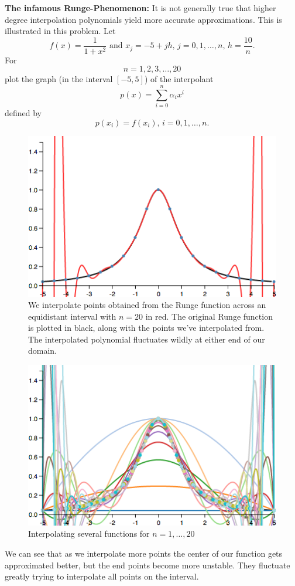\textbf{The infamous Runge-Phenomenon:} It is not generally true that higher degree interpolation polynomials yield more accurate approximations. This is illustrated in this problem. Let \[f(x) = \frac{1}{1+x^2}\text{    and    }x_j = -5 + jh\text{,    }j=0,1,\dots,n\text{,    }h = \frac{10}{n}.\] For \[n=1,2,3,\dots,20\] plot the graph (in the interval $[-5,5]$) of the interpolant \[p(x) = \sum_{i=0}^n \alpha_i x^i\] defined by \[p(x_i) = f(x_i)\text{,    }i=0,1,\dots,n.\]

{\color{blue}

\begin{figure}[H]
\centering
\includegraphics[scale=0.65]{runge-equidistant.png}
\caption{We interpolate points obtained from the Runge function across
  an equidistant interval with $n=20$ in red. The original Runge
  function is plotted in black, along with the points we've
  interpolated from. The interpolated polynomial fluctuates wildly at
  either end of our domain.}
\end{figure}

\begin{figure}[H]
\centering
\includegraphics[scale=0.65]{runge-equidistant-n-1-20.png}
\caption{Interpolating several functions for $n = 1,\dots,20$}
\end{figure}

We can see that as we interpolate more points the center of our
function gets approximated better, but the end points become more
unstable. They fluctuate greatly trying to interpolate all points on
the interval.

}
